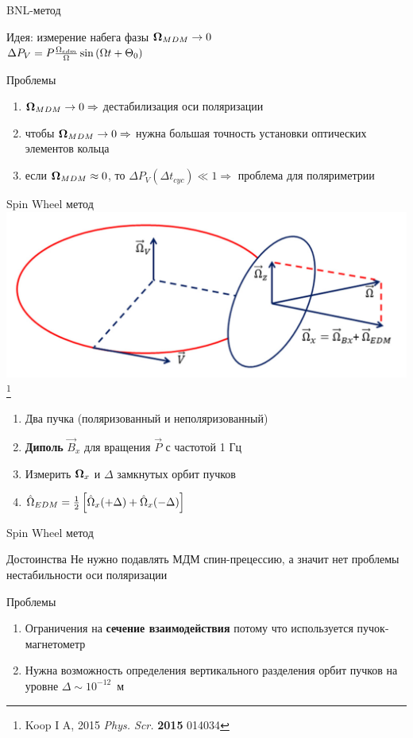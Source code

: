 \documentclass[14pt]{beamer}
\newcommand\blfootnote[1]{%
	\begingroup
	\renewcommand\thefootnote{}\footnote{#1}%
	\addtocounter{footnote}{-1}%
	\endgroup
}
\begin{document}
\begin{frame}{BNL-метод}
	\begin{block}{Идея: измерение набега фазы}
		$\boldsymbol{\Omega}_{MDM}\to 0$\\
		\centering
		$\Delta P_V = P\frac{\Omega_{edm}}{\Omega}\sin\left(\Omega t + \Theta_0\right)$%
	\end{block}
	\begin{block}{Проблемы}
		\begin{enumerate}
			\item $\boldsymbol{\Omega}_{MDM}\to0\Rightarrow$ дестабилизация оси поляризации
			\item чтобы $\boldsymbol{\Omega}_{MDM}\to0\Rightarrow$ нужна большая точность установки оптических элементов кольца
			\item если $\boldsymbol{\Omega}_{MDM}\approx0$, то $\Delta P_V(\Delta t_{cyc})\ll1 \Rightarrow$ проблема для поляриметрии
		\end{enumerate}
	\end{block}
\end{frame}
\begin{frame}{Spin Wheel метод}\centering
	\includegraphics[width=.8\linewidth]{Koop2015}
	\blfootnote{Koop I A, 2015 \textit{Phys. Scr.} \textbf{2015} 014034}
	\begin{enumerate}
		\item Два пучка (поляризованный и неполяризованный)
		\item \textbf{Диполь} $\vec B_x$ для вращения $\vec P$ с частотой 1 Гц
		\item Измерить $\boldsymbol{\Omega}_x$ и $\Delta$ замкнутых орбит пучков
		\item $\hat{\Omega}_{EDM} = \frac12 \left[\hat{\Omega}_x(+\Delta) + \hat{\Omega}_x(-\Delta)\right]$
	\end{enumerate}
\end{frame}
\begin{frame}{Spin Wheel метод}
	\begin{block}{Достоинства}
		Не нужно подавлять МДМ спин-прецессию, а значит нет проблемы нестабильности оси поляризации
	\end{block}
	\begin{block}{Проблемы}
		\begin{enumerate}
			\item Ограничения на \textbf{сечение взаимодействия} потому что используется пучок-магнетометр
			\item Нужна возможность определения вертикального разделения орбит пучков на уровне $\Delta\sim10^{-12}$~м
		\end{enumerate}
	\end{block}
\end{frame}
\end{document}
